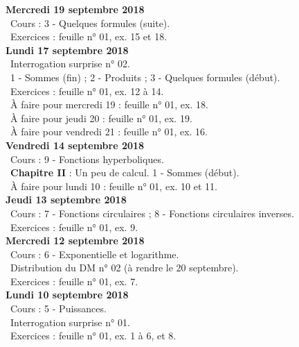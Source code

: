 \documentclass[12pt,a4paper]{article}
\begin{document}
\noindent\textbf{\bf Mercredi 19 septembre 2018}\\
\bu\ Cours : 3 - Quelques formules (suite).\\
\bu\ Exercices : feuille n° 01, ex. 15 et 18.\vspace{.4cm}\\

\noindent\textbf{\bf Lundi 17 septembre 2018}\\ 
\bu\ Interrogation surprise n° 02.\\
\bu\ 1 - Sommes (fin) ; 2 - Produits ; 3 - Quelques formules (début).\\
\bu\ Exercices : feuille n° 01, ex. 12 à 14.\\
\bu\ À faire pour mercredi 19 : feuille n° 01, ex. 18.\\
\bu\ À faire pour jeudi 20 : feuille n° 01, ex. 19.\\
\bu\ À faire pour vendredi 21 : feuille n° 01, ex. 16.\vspace{.4cm}\\

\noindent\textbf{Vendredi 14 septembre 2018}\\
\bu\ Cours : 9 - Fonctions hyperboliques.\\
\bu\ \textbf{Chapitre II} \rm : Un peu de calcul. 1 - Sommes (début).\\
\bu\ À faire pour lundi 10 : feuille n° 01, ex. 10 et 11.\vspace{.4cm}\\

\noindent\textbf{\bf Jeudi 13 septembre 2018}\\
\bu\ Cours : 7 - Fonctions circulaires ; 8 - Fonctions circulaires inverses.\\
\bu\ Exercices : feuille n° 01, ex. 9.\vspace{.4cm}\\
    
\noindent\textbf{\bf Mercredi 12 septembre 2018}\\
\bu\ Cours : 6 - Exponentielle et logarithme.\\
\bu\ Distribution du DM n° 02 (à rendre le 20 septembre).\\
\bu\ Exercices : feuille n° 01, ex. 7.\vspace{.4cm}\\

\noindent\textbf{\bf Lundi 10 septembre 2018}\\
\bu\ Cours : 5 - Puissances.\\
\bu\ Interrogation surprise n° 01.\\
\bu\ Exercices : feuille n° 01, ex. 1 à 6, et 8.\vspace{.4cm}\\
\end{document}
